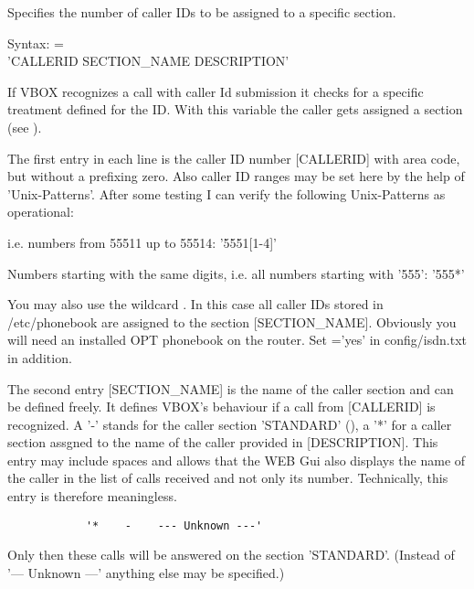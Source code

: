 \begin{description}


    Specifies the number of caller IDs to be assigned to a specific section.


    Syntax: =\\'CALLERID SECTION\_NAME DESCRIPTION'

    If VBOX recognizes a call with caller Id submission it checks for a specific 
    treatment defined for the ID. With this variable the caller gets assigned
    a section\\(see ).
    
    The first entry in each line is the caller ID number [CALLERID] with area code,
    but without a prefixing zero. Also caller ID ranges may be set here by the help
    of 'Unix-Patterns'. After some testing I can verify the following Unix-Patterns
    as operational:
    
    i.e. numbers from 55511 up to 55514: '5551[1-4]'
    
    Numbers starting with the same digits, i.e. all numbers starting with '555': '555*'
    
    You may also use the wildcard . In this case all caller IDs stored in /etc/phonebook
    are assigned to the section [SECTION\_NAME]. Obviously you will need an installed OPT phonebook on
    the router. Set ='yes' in config/isdn.txt in addition.

    The second entry [SECTION\_NAME] is the name of the caller section and can be defined freely.
    It defines VBOX's behaviour if a call from [CALLERID] is recognized. A '-' stands for the caller
    section 'STANDARD' (), a '*' for a caller section assgned to
    the name of the caller provided in [DESCRIPTION]. This entry may include spaces and allows that
    the WEB Gui also displays the name of the caller in the list of calls received and not only its
    number. Technically, this entry is therefore meaningless.

        \begin{verbatim}
            '*    -    --- Unknown ---'
        \end{verbatim}
    Only then these calls will be answered on the section 'STANDARD'.
    (Instead of '--- Unknown ---' anything else may be specified.)




\end{description}
